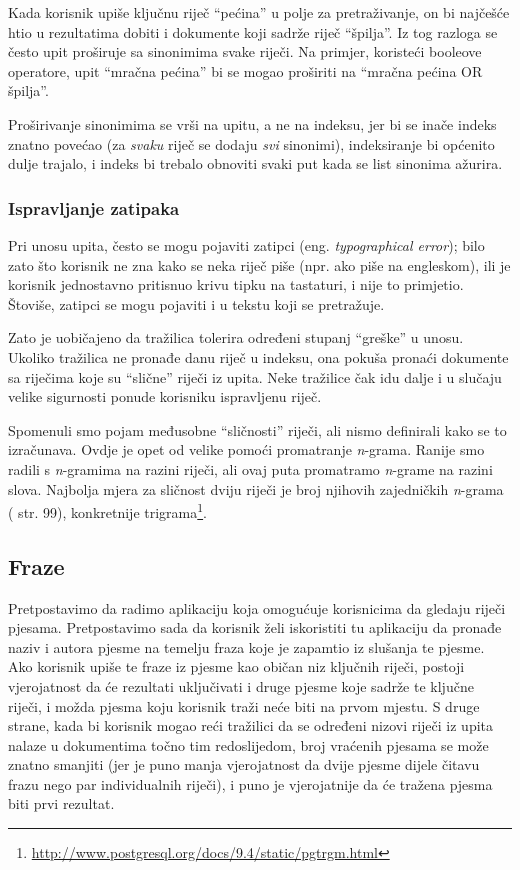 \documentclass[a4paper,twoside,12pt]{scrreprt}
\begin{document}
Kada korisnik upiše ključnu riječ ``pećina'' u polje za pretraživanje, on bi najčešće htio u rezultatima dobiti i dokumente koji sadrže riječ ``špilja''. Iz tog razloga se često upit proširuje sa sinonimima svake riječi. Na primjer, koristeći booleove operatore, upit ``mračna pećina'' bi se mogao proširiti na ``mračna pećina OR špilja''.

Proširivanje sinonimima se vrši na upitu, a ne na indeksu, jer bi se inače indeks znatno povećao (za \textit{svaku} riječ se dodaju \textit{svi} sinonimi), indeksiranje bi općenito dulje trajalo, i indeks bi trebalo obnoviti svaki put kada se list sinonima ažurira.

\subsubsection{Ispravljanje zatipaka}

Pri unosu upita, često se mogu pojaviti zatipci (eng. \textit{typographical error}); bilo zato što korisnik ne zna kako se neka riječ piše (npr. ako piše na engleskom), ili je korisnik jednostavno pritisnuo krivu tipku na tastaturi, i nije to primjetio. Štoviše, zatipci se mogu pojaviti i u tekstu koji se pretražuje.

Zato je uobičajeno da tražilica tolerira određeni stupanj ``greške'' u unosu. Ukoliko tražilica ne pronađe danu riječ u indeksu, ona pokuša pronaći dokumente sa riječima koje su ``slične'' riječi iz upita. Neke tražilice čak idu dalje i u slučaju velike sigurnosti ponude korisniku ispravljenu riječ.

Spomenuli smo pojam međusobne ``sličnosti'' riječi, ali nismo definirali kako se to izračunava. Ovdje je opet od velike pomoći promatranje \textit{n}-grama. Ranije smo radili s \textit{n}-gramima na razini riječi, ali ovaj puta promatramo \textit{n}-grame na razini slova. Najbolja mjera za sličnost dviju riječi je broj njihovih zajedničkih \textit{n}-grama (\cite{taming} str. 99), konkretnije trigrama\footnote{\url{http://www.postgresql.org/docs/9.4/static/pgtrgm.html}}.


\subsection{Fraze}

Pretpostavimo da radimo aplikaciju koja omogućuje korisnicima da gledaju riječi pjesama. Pretpostavimo sada da korisnik želi iskoristiti tu aplikaciju da pronađe naziv i autora pjesme na temelju fraza koje je zapamtio iz slušanja te pjesme. Ako korisnik upiše te fraze iz pjesme kao običan niz ključnih riječi, postoji vjerojatnost da će rezultati uključivati i druge pjesme koje sadrže te ključne riječi, i možda pjesma koju korisnik traži neće biti na prvom mjestu. S druge strane, kada bi korisnik mogao reći tražilici da se određeni nizovi riječi iz upita nalaze u dokumentima točno tim redoslijedom, broj vraćenih pjesama se može znatno smanjiti (jer je puno manja vjerojatnost da dvije pjesme dijele čitavu frazu nego par individualnih riječi), i puno je vjerojatnije da će tražena pjesma biti prvi rezultat.
\end{document}

